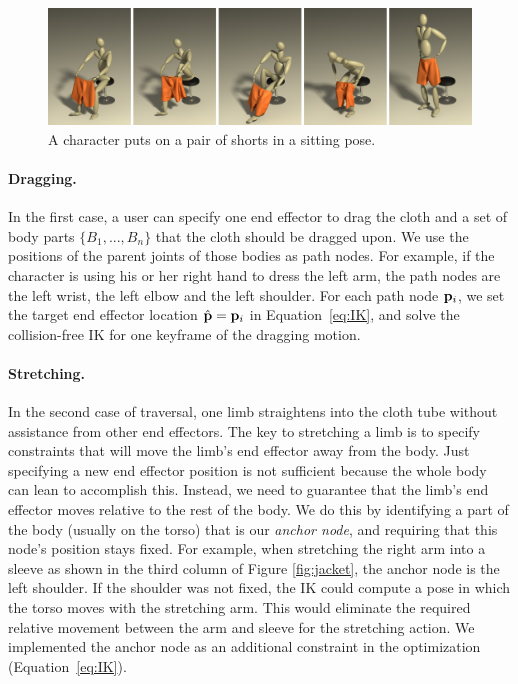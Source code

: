 \begin{figure}[!t]
  \centering
  \includegraphics[width=\textwidth]{images/shortsSitting}
  \caption{A character puts on a pair of shorts in a sitting pose.}
  \label{fig:shorts1}
\end{figure}



\paragraph{Dragging.} In the first case, a user can specify one end effector to drag the cloth and a set of body parts $\{B_1 ,..., B_n\}$ that the cloth should be dragged upon. We use the positions of the parent joints of those bodies as path nodes.  For example, if the character is using his or her right hand to dress the left arm, the path nodes are the left wrist, the left elbow and the left shoulder. For each path node $\mathbf{p}_i$, we set the target end effector location $\hat{\mathbf{p}}=\mathbf{p}_i$ in Equation~\ref{eq:IK}, and solve the collision-free IK for one keyframe of the dragging motion.

\paragraph{Stretching.} In the second case of traversal, one limb straightens into the cloth tube without assistance from other end effectors. The key to stretching a limb is to specify constraints that will move the limb's end effector away from the body. Just specifying a new end effector position is not sufficient because the whole body can lean to accomplish this.  Instead, we need to guarantee that the limb's end effector moves relative to the rest of the body.  We do this by identifying a part of the body (usually on the torso) that is our \emph{anchor node}, and requiring that this node's position stays fixed. For example, when stretching the right arm into a sleeve as shown in the third column of Figure \ref{fig:jacket}, the anchor node is the left shoulder. If the shoulder was not fixed, the IK could compute a pose in which the torso moves with the stretching arm. This would eliminate the required relative movement between the arm and sleeve for the stretching action. We implemented the anchor node as an additional constraint in the optimization (Equation~\ref{eq:IK}).

